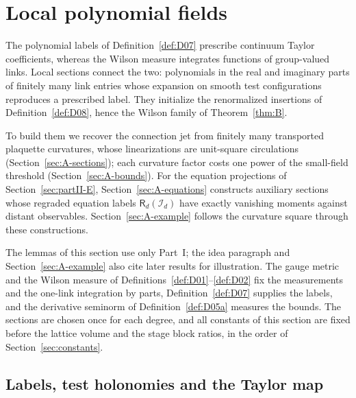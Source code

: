 \section{Local polynomial fields}\label{sec:partII-A}

The polynomial labels of Definition~\ref{def:D07} prescribe continuum Taylor coefficients, whereas the Wilson measure integrates functions of group-valued links. Local sections connect the two: polynomials in the real and imaginary parts of finitely many link entries whose expansion on smooth test configurations reproduces a prescribed label. They initialize the renormalized insertions of Definition~\ref{def:D08}, hence the Wilson family of Theorem~\ref{thm:B}.

To build them we recover the connection jet from finitely many transported plaquette curvatures, whose linearizations are unit-square circulations (Section~\ref{sec:A-sections}); each curvature factor costs one power of the small-field threshold (Section~\ref{sec:A-bounds}). For the equation projections of Section~\ref{sec:partII-E}, Section~\ref{sec:A-equations} constructs auxiliary sections whose regraded equation labels $\mathsf R_d(\mathcal I_d)$ have exactly vanishing moments against distant observables. Section~\ref{sec:A-example} follows the curvature square through these constructions.

The lemmas of this section use only Part~I; the idea paragraph and Section~\ref{sec:A-example} also cite later results for illustration. The gauge metric and the Wilson measure of Definitions~\ref{def:D01}--\ref{def:D02} fix the measurements and the one-link integration by parts, Definition~\ref{def:D07} supplies the labels, and the derivative seminorm of Definition~\ref{def:D05a} measures the bounds. The sections are chosen once for each degree, and all constants of this section are fixed before the lattice volume and the stage block ratios, in the order of Section~\ref{sec:constants}.

\subsection{Labels, test holonomies and the Taylor map}\label{sec:A-labels}

